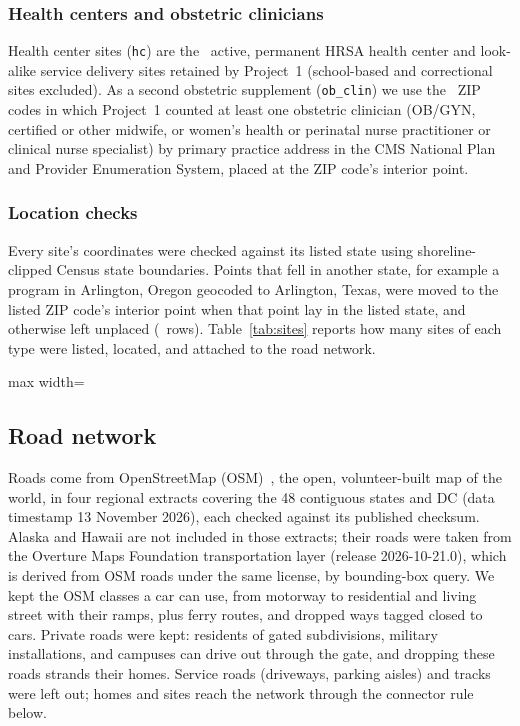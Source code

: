 \documentclass[10pt,twocolumn,letterpaper]{article}
\begin{document}
\subsubsection{Health centers and obstetric clinicians}
Health center sites (\texttt{hc}) are the \SitesHC\ active, permanent HRSA health center and look-alike service delivery sites retained by Project~1 (school-based and correctional sites excluded). As a second obstetric supplement (\texttt{ob\_clin}) we use the \SitesOBC\ ZIP codes in which Project~1 counted at least one obstetric clinician (OB/GYN, certified or other midwife, or women's health or perinatal nurse practitioner or clinical nurse specialist) by primary practice address in the CMS National Plan and Provider Enumeration System, placed at the ZIP code's interior point.

\subsubsection{Location checks}
Every site's coordinates were checked against its listed state using shoreline-clipped Census state boundaries. Points that fell in another state, for example a program in Arlington, Oregon geocoded to Arlington, Texas, were moved to the listed ZIP code's interior point when that point lay in the listed state, and otherwise left unplaced (\StateMismatch\ rows). Table~\ref{tab:sites} reports how many sites of each type were listed, located, and attached to the road network.

\begin{table}[tbp]
\centering\footnotesize
\caption{Care sites by type: listed, located (given coordinates), and routed (attached to a main road network within 25~km).}\label{tab:sites}
\begin{adjustbox}{max width=\columnwidth}\end{adjustbox}
\end{table}

\subsection{Road network}
Roads come from OpenStreetMap (OSM)~\cite{haklay2008}, the open, volunteer-built map of the world, in four regional extracts covering the 48 contiguous states and DC (data timestamp 13 November 2026), each checked against its published checksum. Alaska and Hawaii are not included in those extracts; their roads were taken from the Overture Maps Foundation transportation layer (release 2026-10-21.0), which is derived from OSM roads under the same license, by bounding-box query. We kept the OSM classes a car can use, from motorway to residential and living street with their ramps, plus ferry routes, and dropped ways tagged closed to cars. Private roads were kept: residents of gated subdivisions, military installations, and campuses can drive out through the gate, and dropping these roads strands their homes. Service roads (driveways, parking aisles) and tracks were left out; homes and sites reach the network through the connector rule below.
\end{document}
